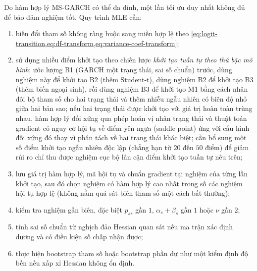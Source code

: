 \documentclass[12pt,a4paper]{article}
\numberwithin{equation}{section}
\begin{document}
Do hàm hợp lý MS-GARCH có thể đa đỉnh, một lần tối ưu duy nhất không đủ để bảo đảm nghiệm tốt. Quy trình MLE cần:
\begin{enumerate}
  \item biến đổi tham số không ràng buộc sang miền hợp lệ theo \cref{eq:logit-transition,eq:df-transform,eq:variance-coef-transform};
  \item sử dụng nhiều điểm khởi tạo theo chiến lược \emph{khởi tạo tuần tự theo thứ bậc mô hình}: ước lượng B1 (GARCH một trạng thái, sai số chuẩn) trước, dùng nghiệm này để khởi tạo B2 (thêm Student-t), dùng nghiệm B2 để khởi tạo B3 (thêm biến ngoại sinh), rồi dùng nghiệm B3 để khởi tạo M1 bằng cách nhân đôi bộ tham số cho hai trạng thái và thêm nhiễu ngẫu nhiên có biên độ nhỏ giữa hai bản sao; nếu hai trạng thái được khởi tạo với giá trị hoàn toàn trùng nhau, hàm hợp lý đối xứng qua phép hoán vị nhãn trạng thái và thuật toán gradient có nguy cơ hội tụ về điểm yên ngựa (saddle point) ứng với cấu hình đối xứng đó thay vì phân tách về hai trạng thái khác biệt; cần bổ sung một số điểm khởi tạo ngẫu nhiên độc lập (chẳng hạn từ $20$ đến $50$ điểm) để giảm rủi ro chỉ thu được nghiệm cục bộ lân cận điểm khởi tạo tuần tự nêu trên;
  \item lưu giá trị hàm hợp lý, mã hội tụ và chuẩn gradient tại nghiệm của từng lần khởi tạo, sau đó chọn nghiệm có hàm hợp lý cao nhất trong số các nghiệm hội tụ hợp lệ (không nằm quá sát biên tham số một cách bất thường);
  \item kiểm tra nghiệm gần biên, đặc biệt $p_{ss}$ gần $1$, $\alpha_s+\beta_s$ gần $1$ hoặc $\nu$ gần $2$;
  \item tính sai số chuẩn từ nghịch đảo Hessian quan sát nếu ma trận xác định dương và có điều kiện số chấp nhận được;
  \item thực hiện bootstrap tham số hoặc bootstrap phần dư như một kiểm định độ bền nếu xấp xỉ Hessian không ổn định.
\end{enumerate}
\end{document}
